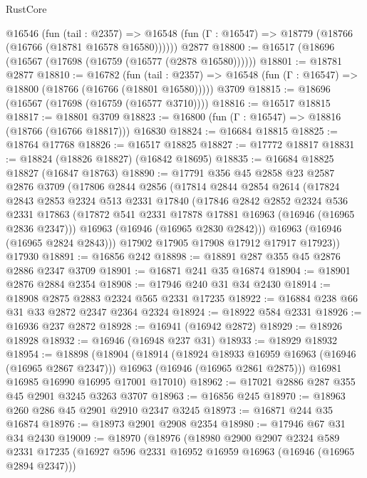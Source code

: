 \begin{lexlean}{RustCore}
\begin{coremodule}
    @16546
      (fun (tail : @2357) =>
      @16548 (fun (Γ : @16547) => @18779 (@18766 (@16766 (@18781 @16578 @16580))))))
    @2877
@18800 := @16517 (@18696 (@16567 (@17698 (@16759 (@16577 (@2878 @16580))))))
@18801 := @18781 @2877
@18810 := @16782
    (fun (tail : @2357) => @16548 (fun (Γ : @16547) => @18800 (@18766 (@16766 (@18801 @16580)))))
    @3709
@18815 := @18696 (@16567 (@17698 (@16759 (@16577 @3710))))
@18816 := @16517 @18815
@18817 := @18801 @3709
@18823 := @16800 (fun (Γ : @16547) => @18816 (@18766 (@16766 @18817))) @16830
@18824 := @16684 @18815
@18825 := @18764 @17768
@18826 := @16517 @18825
@18827 := @17772 @18817
@18831 := @18824 (@18826 @18827) (@16842 @18695)
@18835 := @16684 @18825 @18827 (@16847 @18763)
@18890 := @17791
    @356
    @45
    @2858
    @23
    @2587
    @2876
    @3709
    (@17806
      @2844
      @2856
      (@17814
        @2844
        @2854
        @2614
        (@17824
          @2843
          @2853
          @2324
          @513
          @2331
          @17840
          (@17846
            @2842
            @2852
            @2324
            @536
            @2331
            @17863
            (@17872 @541 @2331 @17878 @17881 @16963 (@16946 (@16965 @2836 @2347)))
            @16963
            (@16946 (@16965 @2830 @2842)))
          @16963
          (@16946 (@16965 @2824 @2843)))
        @17902
        @17905
        @17908
        @17912
        @17917
        @17923))
    @17930
@18891 := @16856 @242
@18898 := @18891 @287 @355 @45 @2876 @2886 @2347 @3709
@18901 := @16871 @241 @35 @16874
@18904 := @18901 @2876 @2884 @2354
@18908 := @17946 @240 @31 @34 @2430
@18914 := @18908 @2875 @2883 @2324 @565 @2331 @17235
@18922 := @16884 @238 @66 @31 @33 @2872 @2347 @2364 @2324
@18924 := @18922 @584 @2331
@18926 := @16936 @237 @2872
@18928 := @16941 (@16942 @2872)
@18929 := @18926 @18928
@18932 := @16946 (@16948 @237 @31)
@18933 := @18929 @18932
@18954 := @18898
    (@18904
      (@18914
        (@18924 @18933 @16959 @16963 (@16946 (@16965 @2867 @2347)))
        @16963
        (@16946 (@16965 @2861 @2875)))
      @16981
      @16985
      @16990
      @16995
      @17001
      @17010)
@18962 := @17021 @2886 @287 @355 @45 @2901 @3245 @3263 @3707
@18963 := @16856 @245
@18970 := @18963 @260 @286 @45 @2901 @2910 @2347 @3245
@18973 := @16871 @244 @35 @16874
@18976 := @18973 @2901 @2908 @2354
@18980 := @17946 @67 @31 @34 @2430
@19009 := @18970
    (@18976
      (@18980
        @2900
        @2907
        @2324
        @589
        @2331
        @17235
        (@16927 @596 @2331 @16952 @16959 @16963 (@16946 (@16965 @2894 @2347)))

\end{coremodule}
\end{lexlean}
